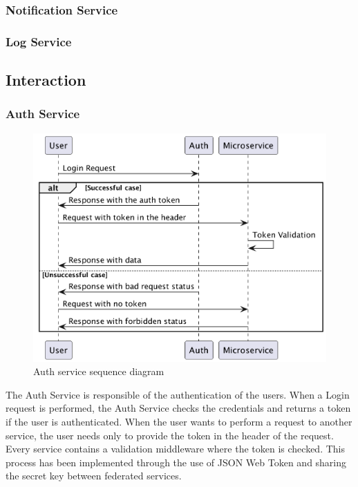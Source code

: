 \documentclass{scrartcl}
\begin{document}
    \subsubsection{Notification Service}

    \subsubsection{Log Service}


    \subsection{Interaction}

    \subsubsection{Auth Service}
    \begin{figure}
        \centering
        \includegraphics[scale=0.3]{img/auth-service-sequence}
        \caption{Auth service sequence diagram}
        \label{fig:auth-service-sequence}
    \end{figure}
    The Auth Service is responsible of the authentication of the users. When a Login request is performed, the Auth Service checks the credentials and returns a token if the user is authenticated. When the user wants to perform a request to another service, the user needs only to provide the token in the header of the request. Every service contains a validation middleware where the token is checked. This process has been implemented through the use of JSON Web Token and sharing the secret key between federated services.
\end{document}
